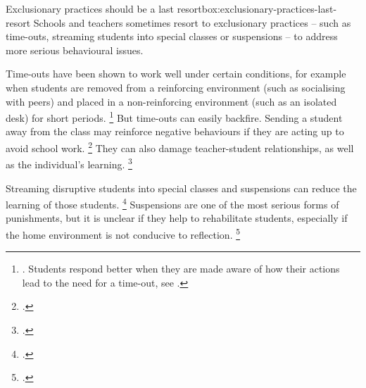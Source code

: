 \documentclass[FrontPage]{grattan}
\begin{document}
 \begin{smallbox}{Exclusionary practices should be a last resort}{box:exclusionary-practices-last-resort}
Schools and teachers sometimes resort to exclusionary practices -- such as time-outs, streaming students into special classes or suspensions -- to address more serious behavioural issues. 
 
Time-outs have been shown to work well under certain conditions, for example when students are removed from a reinforcing environment (such as socialising with peers) and placed in a non-reinforcing environment (such as an isolated desk) for short periods.%
    \footnote{\textcites[][365--6]{Sullivan2014PunishThemEngage}[][141]{TurnerWatson1999ConsultantsGuideTimeOut}. Students respond better when they are made aware of how their actions lead to the need for a time-out, see \textcite[][139]{TurnerWatson1999ConsultantsGuideTimeOut}.}
But time-outs can easily backfire. Sending a student away from the class may reinforce negative behaviours if they are acting up to avoid school work.%
    \footcites{InterventionCentralNDTimeOutReinforcement}{TurnerWatson1999ConsultantsGuideTimeOut} 
They can also damage teacher-student relationships, as well as the individual's learning.%
    \footcites{InterventionCentralNDTimeOutReinforcement}{TurnerWatson1999ConsultantsGuideTimeOut}{Wilhoit2000GuidelinesEffectiveUse}
 
Streaming disruptive students into special classes and suspensions can reduce the learning of those students.%
    \footcites{Graham2016CaughtBetweenRock}{Muller2010NegativePeerInfluence}{Skiba2008SafteyWithoutSuspensions} 
Suspensions are one of the most serious forms of punishments, but it is unclear if they help to rehabilitate students, especially if the home environment is not conducive to reflection.%
    \footcites{Kohistani2015SchoolSuspensionBeneficial}{Osher2010HowCanWeImprove}
\end{smallbox}
\end{document}
